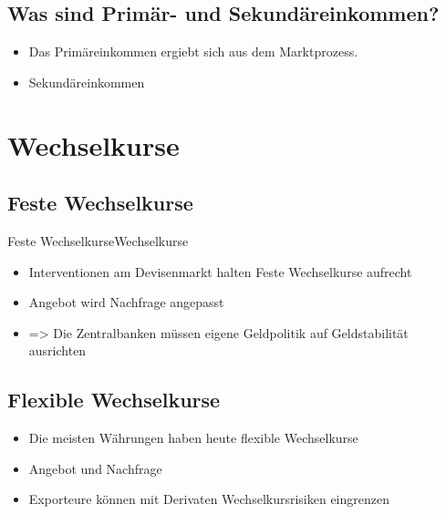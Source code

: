 \documentclass[10pt,a4paper, ngerman]{beamer}
\begin{document}
\subsection{Was sind Primär- und Sekundäreinkommen?}
\begin{frame}
\begin{itemize}
\item Das Primäreinkommen ergiebt sich aus dem Marktprozess. \pause
\item Sekundäreinkommen 
\end{itemize}
\end{frame}

\section{Wechselkurse}
\subsection{Feste Wechselkurse}
\begin{frame}{Feste Wechselkurse}{Wechselkurse}
\begin{itemize}
\item Interventionen am Devisenmarkt halten Feste Wechselkurse aufrecht \pause
\item Angebot wird Nachfrage angepasst \pause
\item => Die Zentralbanken müssen eigene Geldpolitik auf Geldstabilität ausrichten
\end{itemize}
\end{frame}

\subsection{Flexible Wechselkurse}
\begin{frame}
\begin{itemize}
\item Die meisten Währungen haben heute flexible Wechselkurse \pause
\item Angebot und Nachfrage \pause
\item Exporteure können mit Derivaten Wechselkursrisiken eingrenzen
\end{itemize}
\end{frame}
\end{document}
